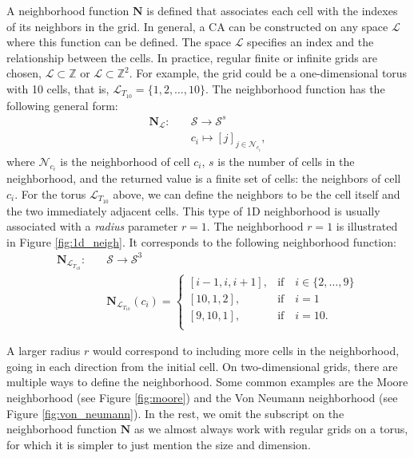 A neighborhood function $\boldsymbol{N}$ is defined that associates each cell
with the indexes of its neighbors in the grid. In general, a \ac{CA} can be
constructed on any space $\mathcal{L}$ where this function can be defined. The space $\mathcal{L}$
specifies an index and the relationship between the cells. In practice, regular
finite or infinite grids are chosen, $\mathcal{L} \subset \mathbb{Z}$ or $\mathcal{L} \subset \mathbb{Z}^{2}$. For example, the
grid could be a one-dimensional torus with 10 cells, that is,
$\mathcal{L}_{{T_{10}}} = \{1, 2, \ldots, 10 \}$. The neighborhood function has the following
general form:
\begin{equation}
  \begin{aligned}
\boldsymbol{N}_{\mathcal{L}} :\quad & \mathcal{S} \rightarrow \mathcal{S}^{s}\\
&{c_i} \mapsto [{j}]_{j\in \mathcal{N}_{c_{i}}},
  \end{aligned}
\end{equation}
where $\mathcal{N}_{c_{i}}$ is the neighborhood of cell $c_{i}$, $s$ is the
number of cells in the neighborhood, and the returned value is a finite set of
cells: the neighbors of cell $c_{i}$. For the torus $\mathcal{L}_{T_{10}}$
above, we can define the neighbors to be the cell itself and the two immediately
adjacent cells. This type of 1D neighborhood is usually associated with a
\emph{radius} parameter $r = 1$. The neighborhood $r=1$ is illustrated in Figure
\ref{fig:1d_neigh}. It corresponds to the following neighborhood function:
\begin{equation}
  \begin{aligned}
\boldsymbol{N}_{\mathcal{L}_{T_{10}}} :\quad & \mathcal{S} \rightarrow \mathcal{S}^{3} \\
&\boldsymbol{N}_{\mathcal{L}_{T_{10}}}(c_{i}) = \begin{cases}
                      [{i - 1}, {i}, {i + 1}],& \text{if}\quad i \in \{2,\ldots , 9\}\\
                       [{10}, {1}, {2}], & \text{if} \quad i = 1 \\
                       [{9}, {10}, {1}], & \text{if} \quad i = 10. \\
                    \end{cases}
  \end{aligned}
  \label{eq:torus_index}
\end{equation}

A larger radius $r$ would correspond to including more cells in the
neighborhood, going in each direction from the initial cell. On two-dimensional
grids, there are multiple ways to define the neighborhood. Some common examples
are the Moore neighborhood (see Figure \ref{fig:moore}) and the Von Neumann
neighborhood (see Figure \ref{fig:von_neumann}). In the rest, we omit the
subscript on the neighborhood function $\boldsymbol{N}$ as we almost always work
with regular grids on a torus, for which it is simpler to just mention the size
and dimension.

